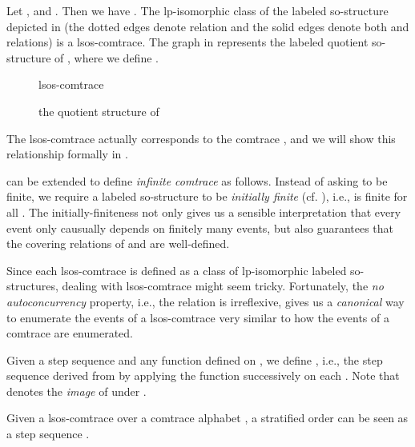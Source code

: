\documentclass{llncs}
\begin{document}
\begin{example}
Let ,  and  . Then we have
. The lp-isomorphic class  of the labeled so-structure  depicted in  (the dotted edges denote  relation and the solid edges denote both  and  relations) is a lsos-comtrace. The graph in  represents the labeled quotient  so-structure  of , where we define .
\begin{figure}[ht]
\begin{minipage}{0.45\linewidth}\centering


\caption{lsos-comtrace }
\label{fig:f1}
\end{minipage}
\begin{minipage}{0.5\linewidth}\centering

\caption{the quotient structure  of }
\label{fig:f2}
\end{minipage}
\end{figure}



The lsos-comtrace  actually corresponds to the comtrace , and we will show this relationship formally in . 
\EOD
\label{ex:comtrace2}
\end{example}




\begin{remark}
 can be extended to define \emph{infinite comtrace} as follows. Instead of asking  to be finite, we require a labeled so-structure to be  \emph{initially finite} (cf. \cite{JK97}), i.e.,  is finite for all . The initially-finiteness not only gives us a sensible interpretation that every event only  causually depends  on finitely many events, but also guarantees that the covering relations of  and  are well-defined. \EOD
\end{remark}

Since each lsos-comtrace is defined as a class of lp-isomorphic labeled so-structures, dealing with lsos-comtrace might seem tricky. Fortunately, the \emph{no autoconcurrency} property, i.e., the relation  is irreflexive, gives us a \emph{canonical} way to enumerate the events of a lsos-comtrace very similar to how the events of a comtrace are enumerated.

Given a step sequence  and any function  defined on , we define , i.e., the step sequence derived from  by applying the function  successively on each . Note that  denotes the \emph{image} of  under .

Given a lsos-comtrace   over a comtrace alphabet ,  a stratified order  can be seen as a step sequence .
\end{document}
